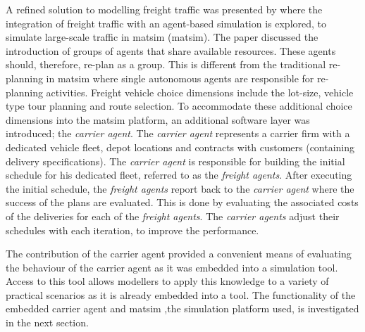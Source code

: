 A refined solution to modelling freight traffic was presented by \citet{zilske2012adding} where the integration of freight traffic with an agent-based simulation is explored, to simulate large-scale traffic in \acrfull{matsim} (\acrshort{matsim}). The paper discussed the introduction of groups of agents that share available resources. These agents should, therefore, re-plan as a group. This is different from the traditional re-planning in \acrshort{matsim} where single autonomous agents are responsible for re-planning activities. Freight vehicle choice dimensions include the lot-size, vehicle type tour planning and route selection. To accommodate these additional choice dimensions into the \acrshort{matsim} platform, an additional software layer was introduced; the \textit{carrier agent}. The \textit{carrier agent} represents a carrier firm with a dedicated vehicle fleet, depot locations and contracts with customers (containing delivery specifications). The \textit{carrier agent} is responsible for building the initial schedule for his dedicated fleet, referred to as the \textit{freight agents}. After executing the initial schedule, the \textit{freight agents} report back to the \textit{carrier agent} where the success of the plans are evaluated. This is done by evaluating the associated costs of the deliveries for each of the \textit{freight agents}. The \textit{carrier agents} adjust their schedules with each iteration, to improve the performance. \par

The contribution of the carrier agent provided a convenient means of evaluating the behaviour of the carrier agent as it was embedded into a simulation tool. Access to this tool allows modellers to apply this knowledge to a variety of practical scenarios as it is already embedded into a tool. The functionality of the embedded carrier agent and \acrshort{matsim} ,the simulation platform used, is investigated in the next section.\par



